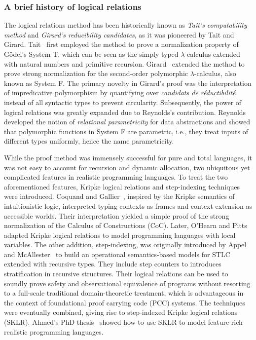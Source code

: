 \documentclass{article}
\theoremstyle{definition}
\theoremstyle{plain}
\theoremstyle{remark}
\begin{document}
\subsubsection{A brief history of logical relations}

The logical relations method has been historically known as \emph{Tait's computability method} and \emph{Girard's reducibility candidates}, as it was pioneered by Tait and Girard.
Tait~\cite{tait1967intensional} first employed the method to prove a normalization property of G\"odel's System T, which can be seen as the simply typed \(\lambda\)-calculus extended with natural numbers and primitive recursion. Girard~\cite{girard1972interpretation} extended the method to prove strong normalization for the second-order polymorphic \(\lambda\)-calculus, also known as System F. The primary novelty in Girard's proof was the interpretation of impredicative polymorphism by quantifying over \emph{candidats de r\'eductibilit\'e} instead of all syntactic types to prevent circularity.
Subsequently, the power of logical relations was greatly expanded due to Reynolds's contribution.
Reynolds~\cite{reynolds1983types} developed the notion of \emph{relational parametricity} for data abstractions and showed that polymorphic functions in System F are parametric, i.e., they treat inputs of different types uniformly, hence the name parametricity.

While the proof method was immensely successful for pure and total languages, it was not easy to account for recursion and dynamic allocation, two ubiquitous yet complicated features in realistic programming languages. To treat the two aforementioned features, Kripke logical relations and step-indexing techniques were introduced.
Coquand and Gallier~\cite{coquand1990proof}, inspired by the Kripke semantics of intuitionistic logic, interpreted typing contexts as frames and context extension as accessible worlds. Their interpretation yielded a simple proof of the strong normalization of the Calculus of Constructions (CoC). Later, O'Hearn and Pitts~\cite{o1993relational,pitts1996reasoning} adapted Kripke logical relations to model programming languages with local variables.
The other addition, step-indexing, was originally introduced by Appel and McAllester~\cite{appel2001indexed} to build an operational semantics-based models for STLC extended with recursive types. They include step counters to introduces stratification in recursive structures. Their logical relations can be used to soundly prove safety and observational equivalence of programs without resorting to a full-scale traditional domain-theoretic treatment, which is advantageous in the context of foundational proof carrying code (PCC) systems.
The techniques were eventually combined, giving rise to step-indexed Kripke logical relations (SKLR). Ahmed's PhD thesis~\cite{ahmed2004semantics} showed how to use SKLR to model feature-rich realistic programming languages.
\end{document}
